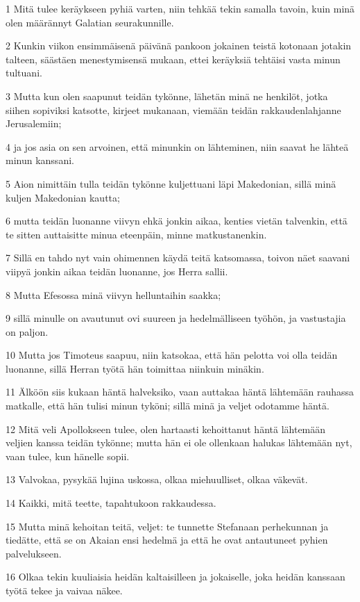 \par 1 Mitä tulee keräykseen pyhiä varten, niin tehkää tekin samalla tavoin, kuin minä olen määrännyt Galatian seurakunnille.
\par 2 Kunkin viikon ensimmäisenä päivänä pankoon jokainen teistä kotonaan jotakin talteen, säästäen menestymisensä mukaan, ettei keräyksiä tehtäisi vasta minun tultuani.
\par 3 Mutta kun olen saapunut teidän tykönne, lähetän minä ne henkilöt, jotka siihen sopiviksi katsotte, kirjeet mukanaan, viemään teidän rakkaudenlahjanne Jerusalemiin;
\par 4 ja jos asia on sen arvoinen, että minunkin on lähteminen, niin saavat he lähteä minun kanssani.
\par 5 Aion nimittäin tulla teidän tykönne kuljettuani läpi Makedonian, sillä minä kuljen Makedonian kautta;
\par 6 mutta teidän luonanne viivyn ehkä jonkin aikaa, kenties vietän talvenkin, että te sitten auttaisitte minua eteenpäin, minne matkustanenkin.
\par 7 Sillä en tahdo nyt vain ohimennen käydä teitä katsomassa, toivon näet saavani viipyä jonkin aikaa teidän luonanne, jos Herra sallii.
\par 8 Mutta Efesossa minä viivyn helluntaihin saakka;
\par 9 sillä minulle on avautunut ovi suureen ja hedelmälliseen työhön, ja vastustajia on paljon.
\par 10 Mutta jos Timoteus saapuu, niin katsokaa, että hän pelotta voi olla teidän luonanne, sillä Herran työtä hän toimittaa niinkuin minäkin.
\par 11 Älköön siis kukaan häntä halveksiko, vaan auttakaa häntä lähtemään rauhassa matkalle, että hän tulisi minun tyköni; sillä minä ja veljet odotamme häntä.
\par 12 Mitä veli Apollokseen tulee, olen hartaasti kehoittanut häntä lähtemään veljien kanssa teidän tykönne; mutta hän ei ole ollenkaan halukas lähtemään nyt, vaan tulee, kun hänelle sopii.
\par 13 Valvokaa, pysykää lujina uskossa, olkaa miehuulliset, olkaa väkevät.
\par 14 Kaikki, mitä teette, tapahtukoon rakkaudessa.
\par 15 Mutta minä kehoitan teitä, veljet: te tunnette Stefanaan perhekunnan ja tiedätte, että se on Akaian ensi hedelmä ja että he ovat antautuneet pyhien palvelukseen.
\par 16 Olkaa tekin kuuliaisia heidän kaltaisilleen ja jokaiselle, joka heidän kanssaan työtä tekee ja vaivaa näkee.
